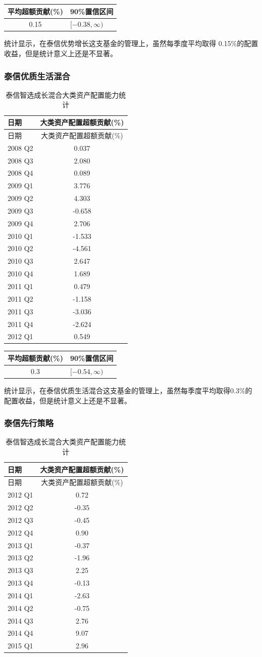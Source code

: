 \documentclass[hyperref,]{ctexart}
\begin{document}
\begin{longtable}[]{@{}cl@{}}
\toprule
平均超额贡献(\%) & 90\%置信区间\tabularnewline
\midrule
\endhead
0.15 & \([-0.38,\infty)\)\tabularnewline
\bottomrule
\end{longtable}

统计显示，在泰信优势增长这支基金的管理上，虽然每季度平均取得
0.15\%的配置收益，但是统计意义上还是不显著。

\subsubsection{泰信优质生活混合}\label{-2}

\begin{longtable}[]{@{}lc@{}}
\caption{泰信智选成长混合大类资产配置能力统计}\tabularnewline
\toprule
日期 & 大类资产配置超额贡献(\%)\tabularnewline
\midrule
\endfirsthead
\toprule
日期 & 大类资产配置超额贡献(\%)\tabularnewline
\midrule
\endhead
2008 Q2 & 0.037\tabularnewline
2008 Q3 & 2.080\tabularnewline
2008 Q4 & 0.089\tabularnewline
2009 Q1 & 3.776\tabularnewline
2009 Q2 & 4.303\tabularnewline
2009 Q3 & -0.658\tabularnewline
2009 Q4 & 2.706\tabularnewline
2010 Q1 & -1.533\tabularnewline
2010 Q2 & -4.561\tabularnewline
2010 Q3 & 2.647\tabularnewline
2010 Q4 & 1.689\tabularnewline
2011 Q1 & 0.479\tabularnewline
2011 Q2 & -1.158\tabularnewline
2011 Q3 & -3.036\tabularnewline
2011 Q4 & -2.624\tabularnewline
2012 Q1 & 0.549\tabularnewline
\bottomrule
\end{longtable}

\begin{longtable}[]{@{}cl@{}}
\toprule
平均超额贡献(\%) & 90\%置信区间\tabularnewline
\midrule
\endhead
0.3 & \([-0.54,\infty)\)\tabularnewline
\bottomrule
\end{longtable}

统计显示，在泰信优质生活混合这支基金的管理上，虽然每季度平均取得0.3\%的配置收益，但是统计意义上还是不显著。

\subsubsection{泰信先行策略}\label{-2}

\begin{longtable}[]{@{}lc@{}}
\caption{泰信智选成长混合大类资产配置能力统计}\tabularnewline
\toprule
日期 & 大类资产配置超额贡献(\%)\tabularnewline
\midrule
\endfirsthead
\toprule
日期 & 大类资产配置超额贡献(\%)\tabularnewline
\midrule
\endhead
2012 Q1 & 0.72\tabularnewline
2012 Q2 & -0.35\tabularnewline
2012 Q3 & -0.45\tabularnewline
2012 Q4 & 0.90\tabularnewline
2013 Q1 & -0.37\tabularnewline
2013 Q2 & -1.96\tabularnewline
2013 Q3 & 2.25\tabularnewline
2013 Q4 & -0.13\tabularnewline
2014 Q1 & -2.63\tabularnewline
2014 Q2 & -0.75\tabularnewline
2014 Q3 & 2.76\tabularnewline
2014 Q4 & 9.07\tabularnewline
2015 Q1 & 2.96\tabularnewline
\bottomrule
\end{longtable}
\end{document}
